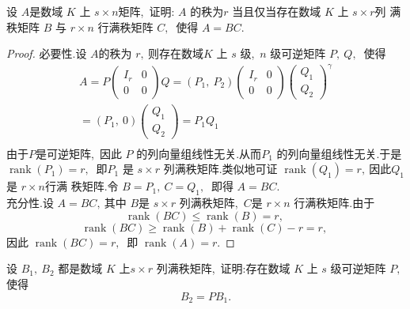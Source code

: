 \newpage
\begin{problem}
	设 $ A  $是数域  $K $ 上  $s \times n  $矩阵,\  证明:  $A $ 的秩为$  r $ 当且仅当存在数域  $K$  上 $ s \times r  $列 满秩矩阵  $B $ 与 $ r \times n $ 行满秩矩阵 $ C ,\ $ 使得 $ A=B C .$
\end{problem}
\begin{proof}
	必要性.设  $A  $的秩为 $ r ,\  $则存在数域$  K $ 上 $ s $ 级,\ $n$  级可逆矩阵  $P,\ Q ,\ $ 使得
	$$\begin{array}{l}
		A=P\left(\begin{array}{cc}
			I_{r} & 0 \\
			0 & 0
		\end{array}\right) Q=\left(P_{1},\  P_{2}\right)\left(\begin{array}{cc}
			I_{r} & 0 \\
			0 & 0
		\end{array}\right)\left(\begin{array}{c}
			Q_{1} \\
			Q_{2}
		\end{array}\right)^{\gamma} \\
		=\left(P_{1},\  0\right)\left(\begin{array}{l}
			Q_{1} \\
			Q_{2}
		\end{array}\right)=P_{1} Q_{1} \\
	\end{array}$$
	由于$  P  $是可逆矩阵,\  因此 $ P$  的列向量组线性无关.从而$  P_{1} $ 的列向量组线性无关.于是 $ \operatorname{rank}\left(P_{1}\right)=r ,\ $ 即$  P_{1} $ 是 $ s \times r $ 列满秩矩阵.类似地可证  $\operatorname{rank}\left(Q_{1}\right)=r ,\  $因此$  Q_{1}  $是 $ r \times n  $行满 秩矩阵.令  $B=P_{1},\  C=Q_{1} ,\ $ 即得 $ A=B C .$\\
	充分性.设 $ A=B C ,\  $其中 $ B  $是 $ s \times r $ 列满秩矩阵,\ $  C  $是 $ r \times n $ 行满秩矩阵.由于 
	$$ \operatorname{rank}(B C) \leqslant \operatorname{rank}(B)=r ,\ $$  $$\operatorname{rank}(B C) \geqslant \operatorname{rank}(B)+\operatorname{rank}(C)-r=r ,\ $$
	因此 $ \operatorname{rank}(B C)=r ,\ $ 即  $\operatorname{rank}(A)=r .$
\end{proof}
\newpage
\begin{problem}
	设 $ B_{1},\  B_{2}$  都是数域  $K $ 上$  s \times r $ 列满秩矩阵,\  证明:存在数域  $K $ 上 $ s $ 级可逆矩阵  $P ,\ $ 使得
	$$B_{2}=P B_{1} .$$
\end{problem}
